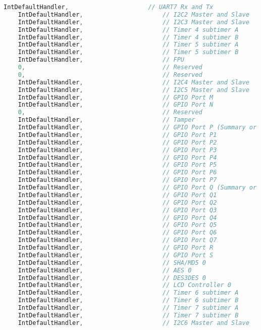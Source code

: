 \documentclass{article}
\begin{document}
\begin{lstlisting}[language=c, caption={startup$\textunderscore$ccs.c}, captionpos=b]
    IntDefaultHandler,                      // UART7 Rx and Tx
    IntDefaultHandler,                      // I2C2 Master and Slave
    IntDefaultHandler,                      // I2C3 Master and Slave
    IntDefaultHandler,                      // Timer 4 subtimer A
    IntDefaultHandler,                      // Timer 4 subtimer B
    IntDefaultHandler,                      // Timer 5 subtimer A
    IntDefaultHandler,                      // Timer 5 subtimer B
    IntDefaultHandler,                      // FPU
    0,                                      // Reserved
    0,                                      // Reserved
    IntDefaultHandler,                      // I2C4 Master and Slave
    IntDefaultHandler,                      // I2C5 Master and Slave
    IntDefaultHandler,                      // GPIO Port M
    IntDefaultHandler,                      // GPIO Port N
    0,                                      // Reserved
    IntDefaultHandler,                      // Tamper
    IntDefaultHandler,                      // GPIO Port P (Summary or P0)
    IntDefaultHandler,                      // GPIO Port P1
    IntDefaultHandler,                      // GPIO Port P2
    IntDefaultHandler,                      // GPIO Port P3
    IntDefaultHandler,                      // GPIO Port P4
    IntDefaultHandler,                      // GPIO Port P5
    IntDefaultHandler,                      // GPIO Port P6
    IntDefaultHandler,                      // GPIO Port P7
    IntDefaultHandler,                      // GPIO Port Q (Summary or Q0)
    IntDefaultHandler,                      // GPIO Port Q1
    IntDefaultHandler,                      // GPIO Port Q2
    IntDefaultHandler,                      // GPIO Port Q3
    IntDefaultHandler,                      // GPIO Port Q4
    IntDefaultHandler,                      // GPIO Port Q5
    IntDefaultHandler,                      // GPIO Port Q6
    IntDefaultHandler,                      // GPIO Port Q7
    IntDefaultHandler,                      // GPIO Port R
    IntDefaultHandler,                      // GPIO Port S
    IntDefaultHandler,                      // SHA/MD5 0
    IntDefaultHandler,                      // AES 0
    IntDefaultHandler,                      // DES3DES 0
    IntDefaultHandler,                      // LCD Controller 0
    IntDefaultHandler,                      // Timer 6 subtimer A
    IntDefaultHandler,                      // Timer 6 subtimer B
    IntDefaultHandler,                      // Timer 7 subtimer A
    IntDefaultHandler,                      // Timer 7 subtimer B
    IntDefaultHandler,                      // I2C6 Master and Slave

\end{lstlisting}
\end{document}

